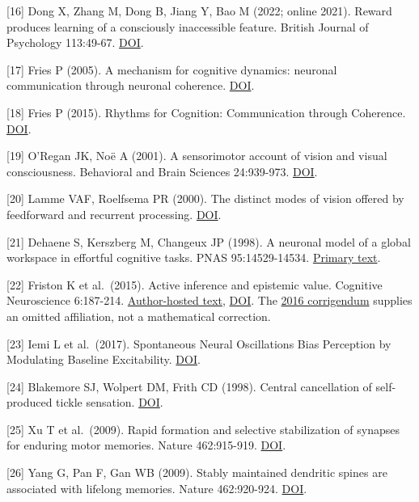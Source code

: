 \documentclass[
  american,
  11pt,
  letterpaper,
]{article}
\begin{document}
{[}16{]} Dong X, Zhang M, Dong B, Jiang Y, Bao M (2022; online 2021). Reward produces learning of a consciously inaccessible feature. British Journal of Psychology 113:49-67. \href{https://doi.org/10.1111/bjop.12518}{DOI}.

{[}17{]} Fries P (2005). A mechanism for cognitive dynamics: neuronal communication through neuronal coherence. \href{https://doi.org/10.1016/j.tics.2005.08.011}{DOI}.

{[}18{]} Fries P (2015). Rhythms for Cognition: Communication through Coherence. \href{https://doi.org/10.1016/j.neuron.2015.09.034}{DOI}.

{[}19{]} O'Regan JK, Noë A (2001). A sensorimotor account of vision and visual consciousness. Behavioral and Brain Sciences 24:939-973. \href{https://doi.org/10.1017/S0140525X01000115}{DOI}.

{[}20{]} Lamme VAF, Roelfsema PR (2000). The distinct modes of vision offered by feedforward and recurrent processing. \href{https://doi.org/10.1016/S0166-2236(00)01657-X}{DOI}.

{[}21{]} Dehaene S, Kerszberg M, Changeux JP (1998). A neuronal model of a global workspace in effortful cognitive tasks. PNAS 95:14529-14534. \href{https://pmc.ncbi.nlm.nih.gov/articles/PMC24407/}{Primary text}.

{[}22{]} Friston K et al.~(2015). Active inference and epistemic value. Cognitive Neuroscience 6:187-214. \href{https://www.fil.ion.ucl.ac.uk/~karl/Active\%20inference\%20and\%20epistemic\%20value.pdf}{Author-hosted text}, \href{https://doi.org/10.1080/17588928.2015.1020053}{DOI}. The \href{https://doi.org/10.1080/17588928.2016.1164961}{2016 corrigendum} supplies an omitted affiliation, not a mathematical correction.

{[}23{]} Iemi L et al.~(2017). Spontaneous Neural Oscillations Bias Perception by Modulating Baseline Excitability. \href{https://doi.org/10.1523/JNEUROSCI.1432-16.2016}{DOI}.

{[}24{]} Blakemore SJ, Wolpert DM, Frith CD (1998). Central cancellation of self-produced tickle sensation. \href{https://doi.org/10.1038/2870}{DOI}.

{[}25{]} Xu T et al.~(2009). Rapid formation and selective stabilization of synapses for enduring motor memories. Nature 462:915-919. \href{https://doi.org/10.1038/nature08389}{DOI}.

{[}26{]} Yang G, Pan F, Gan WB (2009). Stably maintained dendritic spines are associated with lifelong memories. Nature 462:920-924. \href{https://doi.org/10.1038/nature08577}{DOI}.
\end{document}
